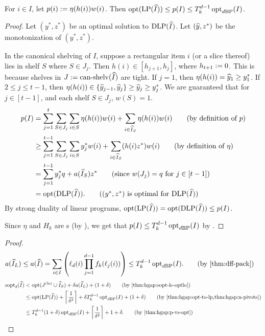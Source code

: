 \begin{lemma}
\label{thm:hgap:p-vs-opt}
For $i \in I$, let $p(i) := \eta(h(i))w(i)$.
Then $\operatorname{opt}(\operatorname{LP}(\widehat{I})) \le p(I) \le T_k^{d-1}\operatorname{opt}_{d\mathrm{BP}}(I)$.
\end{lemma}
\begin{proof}
Let $(y^*, z^*)$ be an optimal solution to $\operatorname{DLP}(\widehat{I})$.
Let $(\widehat{y}, z^*)$ be the monotonization of $(y^*, z^*)$.

In the canonical shelving of $I$, suppose a rectangular item $i$ (or a slice thereof)
lies in shelf $S$ where $S \in J_j$.
Then $h(i) \in [h_{j+1}, h_j]$, where $h_{t+1} := 0$.
This is because shelves in $J := \operatorname{can-shelv}(\widehat{I})$ are tight.
If $j = 1$, then $\eta(h(i)) = \widehat{y}_1 \ge y^*_1$.
If $2 \le j \le t-1$, then $\eta(h(i)) \in \{\widehat{y}_{j-1}, \widehat{y}_j\} \ge \widehat{y}_j \ge y^*_j$.
We are guaranteed that for $j \in [t-1]$, and each shelf $S \in J_j$, $w(S) = 1$.
\begin{align*}
p(I) &= \sum_{j=1}^t \sum_{S \in J_j} \sum_{i \in S} \eta(h(i))w(i)
    + \sum_{i \in \Ihat_S} \eta(h(i))w(i)
    \tag{by definition of $p$}
\\ &\ge \sum_{j=1}^{t-1} \sum_{S \in J_j} \sum_{i \in S} y^*_j w(i)
    + \sum_{i \in \Ihat_S} (h(i)z^*)w(i)
\tag{by definition of $\eta$}
\\ &= \sum_{j=1}^{t-1} y^*_j q + a(\Ihat_S)z^*
\tag{since $w(J_j) = q$ for $j \in [t-1]$}
\\ &= \opt(\DLP(\Ihat)).
\tag{$(y^*, z^*)$ is optimal for $\DLP(\Ihat)$}
\end{align*}
By strong duality of linear programs, $\operatorname{opt}(\operatorname{LP}(\widehat{I})) = \operatorname{opt}(\operatorname{DLP}(\widehat{I})) \le p(I)$.

Since $\eta$ and $H_k$ are \dff{}s (by ),
we get that $p(I) \le T_k^{d-1}\operatorname{opt}_{d\mathrm{BP}}(I)$ by .
\end{proof}

\rthmHgapStruct*
\begin{proof}
\begin{align*}
& a(\Ihat_L) \le a(\Ihat)
= \sum_{i \in I} \left(\ell_d(i)\prod_{j=1}^{d-1} f_k(\ell_j(i))\right)
\le T_k^{d-1}\optdbp(I).
\tag{by \thmdepcref{thm:dff-pack}{thm:hgap:struct}}
\end{align*}
\begin{align*}
\sopt_{\delta}(\Ihat) &< \opt(J\lo \cup \Ihat_S) + \delta a(\Ihat_L) + (1+\delta)
\tag{by \thmdepcref{thm:hgap:sopt-le-optlo}{thm:hgap:struct}}
\\ &\le \opt(\LP(\Ihat)) + \ceil{\frac{1}{\delta^2}} + \delta T_k^{d-1}\optdbp(I) + (1+\delta)
\tag{by \thmdepcref{thm:hgap:opt-to-lp,thm:hgap:n-pivots}{thm:hgap:struct}}
\\ &\le T_k^{d-1}(1+\delta)\optdbp(I) + \ceil{\frac{1}{\delta^2}} + 1 + \delta.
\tag{by \thmdepcref{thm:hgap:p-vs-opt}{thm:hgap:struct}}
\end{align*}
\end{proof}

